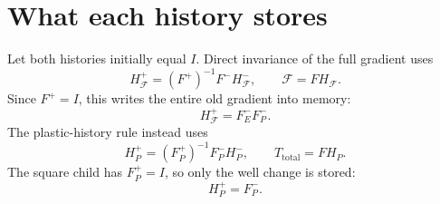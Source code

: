 \documentclass[9pt,a4paper]{extarticle}
\newcommand{\Fminus}{F^-}
\newcommand{\Fplus}{F^+}
\newcommand{\Em}{F_E^-}
\newcommand{\Pm}{F_P^-}
\newcommand{\Pp}{F_P^+}
\newcommand{\Hf}{H_{\mathcal F}}
\newcommand{\Hp}{H_P}
\newcommand{\Ttot}{T_{\mathrm{total}}}
\begin{document}
\section{What each history stores}

Let both histories initially equal $I$.  Direct invariance of the full gradient
uses
\begin{equation}
\Hf^+=(\Fplus)^{-1}\Fminus\Hf^-,
\qquad \mathcal F=F\Hf.
\label{eq:direct}
\end{equation}
Since $\Fplus=I$, this writes the entire old gradient into memory:
\begin{equation}
\boxed{\Hf^+=\Em\Pm.}
\label{eq:directmemory}
\end{equation}
The plastic-history rule instead uses
\begin{equation}
\Hp^+=(\Pp)^{-1}\Pm\Hp^-,
\qquad \Ttot=F\Hp.
\label{eq:plasticupdate}
\end{equation}
The square child has $\Pp=I$, so only the well change is stored:
\begin{equation}
\boxed{\Hp^+=\Pm.}
\label{eq:plasticmemory}
\end{equation}
\end{document}
